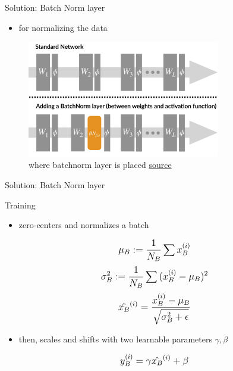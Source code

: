 \begin{frame}{Solution: Batch Norm layer}
	\begin{itemize}
		\item for normalizing the data
	\end{itemize}
	\begin{figure}[H]
		\centering
		\includegraphics[width=0.75\textwidth]{Figs/section_4/batchnorm_2.jpg}
		\caption{where batchnorm layer is placed \href{https://gradientscience.org/batchnorm/}{source}}
	\end{figure}
\end{frame}
\begin{frame}{Solution: Batch Norm layer}
	\begin{block}{Training}
		\begin{itemize}
			\item zero-centers and normalizes a batch
		\end{itemize}
		\begin{equation*}
			\mathlarger{
				\mu_B := \frac{1}{N_B} \sum{x_B^{(i)}}
			}
		\end{equation*}
		\begin{equation*}
			\mathlarger{
				\sigma_B^2 := \frac{1}{N_B} \sum{(x_B^{(i)} - \mu_B)^2}
			}
		\end{equation*}
		\begin{equation*}
			\mathlarger{
				\hat{x_B}^{(i)} = \frac{x_B^{(i)} - \mu_B}{\sqrt{\sigma^2_B + \epsilon}}
			}
		\end{equation*}
		\begin{itemize}
			\item then, scales and shifts with two learnable parameters $\gamma, \beta$
		\end{itemize}
		\begin{equation*}
			\mathlarger{
				y_B^{(i)} = \gamma \hat{x_B}^{(i)} + \beta	
			}
		\end{equation*}
	\end{block}
\end{frame}
